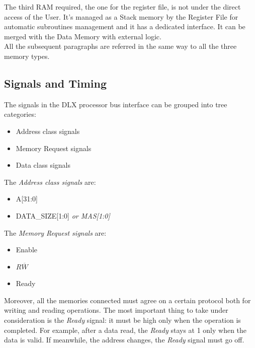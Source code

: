 The third RAM required, the one for the register file, is not under the direct access of the User. It's managed as a Stack memory by the Register File for automatic subroutines management and it has a dedicated interface. It can be merged with the Data Memory with external logic.\\


All the subsequent paragraphs are referred in the same way to all the three memory types.

\subsection{Signals and Timing}
The signals in the DLX processor bus interface can be grouped into tree categories:
\begin{itemize}
    \itemsep0sp
    \item Address class signals
    \item Memory Request signals
    \item Data class signals
\end{itemize}

The \emph{Address class signals} are:
\begin{itemize}
    \itemsep0sp
    \item A{[31:0]}
    \item DATA\_SIZE{[1:0]} \emph{or MAS{[1:0]}}
\end{itemize}

The \emph{Memory Request signals} are:
\begin{itemize}
    \itemsep0sp
    \item Enable
    \item $R\overline{W}$
    \item Ready
\end{itemize}

Moreover, all the memories connected must agree on a certain protocol both for writing and reading operations. The most important thing to take under consideration is the \emph{Ready} signal: it must be high only when the operation is completed. For example, after a data read, the \emph{Ready} stays at 1 only when the data is valid. If meanwhile, the address changes, the \emph{Ready} signal must go off.

